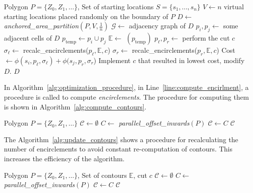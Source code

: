 \documentclass[../main.tex]{subfiles}
\begin{document}
\begin{algorithm}
	\small
	\caption{$\operatorname{optimization\_procedure}(P, S)$}
	\label{alg:optimization_procedure}
	\begin{algorithmic}[1]
		\REQUIRE Polygon $P=\{Z_0,Z_1,\ldots\}$, Set of starting locations $S=\{s_1,\ldots,s_n\}$
			\STATE $V\gets n$ virtual starting locations placed randomly on the boundary of $P$ \label{line:1_start_locs}
			\STATE $D\gets$ \textit{anchored\_area\_partition}$(P,V,\frac{1}{n})$
			\STATE $\mathcal{G}\gets$ adjacency graph of $D$
			\REPEAT
				\STATE $p_i,p_j\gets$ some adjacent cells of $D$
				\STATE $p_{\operatorname{temp}}\gets p_i\cup p_j$
				\STATE $\mathbb{E}\gets$ $(p_{\operatorname{temp}})$ \label{line:compute_encirlment}
					\STATE $p_{\ell},p_r\gets$ perform the cut $c$
					\STATE $\sigma_{\ell}\gets$ recalc\_encirclements($p_{\ell},\mathbb{E}, c$) \label{line:recalc_encirclemnts_1}
					\STATE $\sigma_r\gets$ recalc\_encirclements($p_r, \mathbb{E}, c$) \label{line:recalc_encirclemnts_2}
					\STATE Cost $\gets\phi(s_i,p_{\ell},\sigma_{\ell})+\phi(s_j,p_r,\sigma_r$) 
				\ENDFOR
				\STATE Implement $c$ that resulted in lowest cost, modify $D$.
			\RETURN $D$
	\end{algorithmic}
\end{algorithm}

In Algorithm~\ref{alg:optimization_procedure}, in Line~\ref{line:compute_encirlment}, a procedure is called to compute \emph{encirclements}. The procedure for computing them is shown in Algorithm~\ref{alg:compute_contours}.
\begin{algorithm}
	\small
	\caption{$\operatorname{compute\_encirclements}$}
	\label{alg:compute_contours}
	\begin{algorithmic}[1]
		\REQUIRE Polygon $P=\{Z_0,Z_1,\ldots\}$
		\STATE $\mathcal{C}\gets\emptyset$ 
		\REPEAT
			\STATE $C\gets$ \textit{parallel\_offset\_inwards}$(P)$
			\STATE $\mathcal{C}\gets C$
		\RETURN $\mathcal{C}$
	\end{algorithmic}
\end{algorithm}

The Algorithm~\ref{alg:update_contours} shows a procedure for recalculating the number of encirclements to avoid constant re-computation of contours. This increases the efficiency of the algorithm.
\begin{algorithm}
	\small
	\caption{$\operatorname{recalc\_encirclements}$}
	\label{alg:update_contours}
	\begin{algorithmic}[1]
		\REQUIRE Polygon $P=\{Z_0,Z_1,\ldots\}$, Set of contours $\mathbb{E}$, cut $c$
		\STATE $\mathcal{C}\gets\emptyset$ 
		\REPEAT
			\STATE $C\gets$ \textit{parallel\_offset\_inwards}$(P)$
			\STATE $\mathcal{C}\gets C$
		\RETURN $\mathcal{C}$
	\end{algorithmic}
\end{algorithm}
\end{document}

